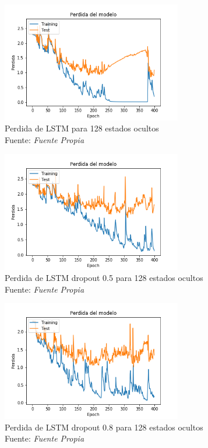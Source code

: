 \begin{figure}[H]
	\centering
	\includegraphics[width=0.7\textwidth]{Figures/lstm_400_cost_13mfcc}
	\caption{Perdida de LSTM para 128 estados ocultos\\ Fuente: {\textit{Fuente Propia}}}
	\label{LSTMsimplecost}
\end{figure} 

\begin{figure}[H]
	\centering
	\includegraphics[width=0.7\textwidth]{Figures/lstm_400drop05_cost_13mfcc}
	\caption{Perdida de LSTM dropout 0.5 para 128 estados ocultos\\ Fuente: {\textit{Fuente Propia}}}
	\label{LSTMdropout5cost}
\end{figure} 


\begin{figure}[H]
	\centering
	\includegraphics[width=0.7\textwidth]{Figures/lstm_400drop08_cost_13mfcc}
	\caption{Perdida de LSTM dropout 0.8 para 128 estados ocultos\\ Fuente: {\textit{Fuente Propia}}}
	\label{LSTMdropout8cost}
\end{figure} 

